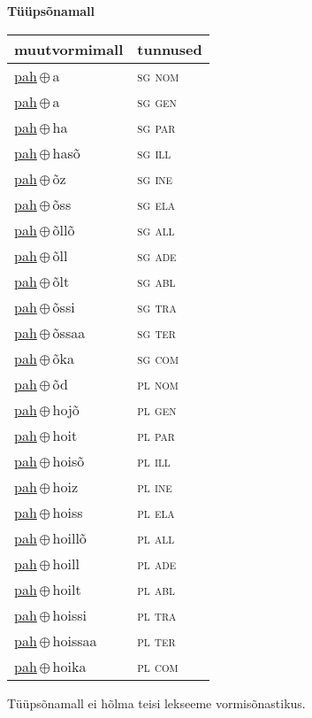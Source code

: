 

\vspace{3.5em}
\noindent \begin{minipage}{\textwidth}
\noindent \textbf{Tüüpsõnamall \,}\\

\begin{sideways}
\begin{tabular}{l l}
muutvormimall & tunnused \\
\hline
\underline{pah}\,$\oplus$\,a & \textsc{ sg nom } \\
\underline{pah}\,$\oplus$\,a & \textsc{ sg gen } \\
\underline{pah}\,$\oplus$\,ha & \textsc{ sg par } \\
\underline{pah}\,$\oplus$\,hasõ & \textsc{ sg ill } \\
\underline{pah}\,$\oplus$\,õz & \textsc{ sg ine } \\
\underline{pah}\,$\oplus$\,õss & \textsc{ sg ela } \\
\underline{pah}\,$\oplus$\,õllõ & \textsc{ sg all } \\
\underline{pah}\,$\oplus$\,õll & \textsc{ sg ade } \\
\underline{pah}\,$\oplus$\,õlt & \textsc{ sg abl } \\
\underline{pah}\,$\oplus$\,õssi & \textsc{ sg tra } \\
\underline{pah}\,$\oplus$\,õssaa & \textsc{ sg ter } \\
\underline{pah}\,$\oplus$\,õka & \textsc{ sg com } \\
\underline{pah}\,$\oplus$\,õd & \textsc{ pl nom } \\
\underline{pah}\,$\oplus$\,hojõ & \textsc{ pl gen } \\
\underline{pah}\,$\oplus$\,hoit & \textsc{ pl par } \\
\underline{pah}\,$\oplus$\,hoisõ & \textsc{ pl ill } \\
\underline{pah}\,$\oplus$\,hoiz & \textsc{ pl ine } \\
\underline{pah}\,$\oplus$\,hoiss & \textsc{ pl ela } \\
\underline{pah}\,$\oplus$\,hoillõ & \textsc{ pl all } \\
\underline{pah}\,$\oplus$\,hoill & \textsc{ pl ade } \\
\underline{pah}\,$\oplus$\,hoilt & \textsc{ pl abl } \\
\underline{pah}\,$\oplus$\,hoissi & \textsc{ pl tra } \\
\underline{pah}\,$\oplus$\,hoissaa & \textsc{ pl ter } \\
\underline{pah}\,$\oplus$\,hoika & \textsc{ pl com } \\
\end{tabular}
\end{sideways}
\label{tab:tüüpsõnamall-paha}

\end{minipage}

 
\vspace{1em}
\noindent Tüüpsõnamall  ei hõlma teisi lekseeme vormi\-sõnastikus.
